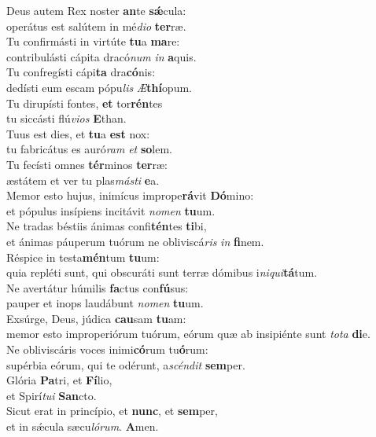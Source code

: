\oddverse Deus autem Rex noster \textbf{an}te \textbf{sǽ}cula:~\*\\
\oddverse operátus est salútem in mé\textit{di}\textit{o} \textbf{ter}ræ.\\
\evenverse Tu confirmásti in virtúte \textbf{tu}a \textbf{ma}re:~\*\\
\evenverse contribulásti cápita dracó\textit{num} \textit{in} \textbf{a}quis.\\
\oddverse Tu confregísti cápi\textbf{ta} dra\textbf{có}nis:~\*\\
\oddverse dedísti eum escam pópu\textit{lis} \textit{Æ}\textbf{thí}opum.\\
\evenverse Tu dirupísti fontes, \textbf{et} tor\textbf{rén}tes~\*\\
\evenverse tu siccásti flú\textit{vi}\textit{os} \textbf{E}than.\\
\oddverse Tuus est dies, et \textbf{tu}a \textbf{est} nox:~\*\\
\oddverse tu fabricátus es auró\textit{ram} \textit{et} \textbf{so}lem.\\
\evenverse Tu fecísti omnes \textbf{tér}minos \textbf{ter}ræ:~\*\\
\evenverse æstátem et ver tu plas\textit{má}\textit{sti} \textbf{e}a.\\
\oddverse Memor esto hujus, inimícus imprope\textbf{rá}vit \textbf{Dó}mino:~\*\\
\oddverse et pópulus insípiens incitávit \textit{no}\textit{men} \textbf{tu}um.\\
\evenverse Ne tradas béstiis ánimas confi\textbf{tén}tes \textbf{ti}bi,~\*\\
\evenverse et ánimas páuperum tuórum ne obliviscá\textit{ris} \textit{in} \textbf{fi}nem.\\
\oddverse Réspice in testa\textbf{mén}tum \textbf{tu}um:~\*\\
\oddverse quia repléti sunt, qui obscuráti sunt terræ dómibus i\textit{ni}\textit{qui}\textbf{tá}tum.\\
\evenverse Ne avertátur húmilis \textbf{fa}ctus con\textbf{fú}sus:~\*\\
\evenverse pauper et inops laudábunt \textit{no}\textit{men} \textbf{tu}um.\\
\oddverse Exsúrge, Deus, júdica \textbf{cau}sam \textbf{tu}am:~\*\\
\oddverse memor esto improperiórum tuórum, eórum quæ ab insipiénte sunt \textit{to}\textit{ta} \textbf{di}e.\\
\evenverse Ne obliviscáris voces inimi\textbf{có}rum tu\textbf{ó}rum:~\*\\
\evenverse supérbia eórum, qui te odérunt, a\textit{scén}\textit{dit} \textbf{sem}per.\\
\oddverse Glória \textbf{Pa}tri, et \textbf{Fí}lio,~\*\\
\oddverse et Spirí\textit{tu}\textit{i} \textbf{San}cto.\\
\evenverse Sicut erat in princípio, et \textbf{nunc}, et \textbf{sem}per,~\*\\
\evenverse et in sǽcula sæcu\textit{ló}\textit{rum}. \textbf{A}men.\\
